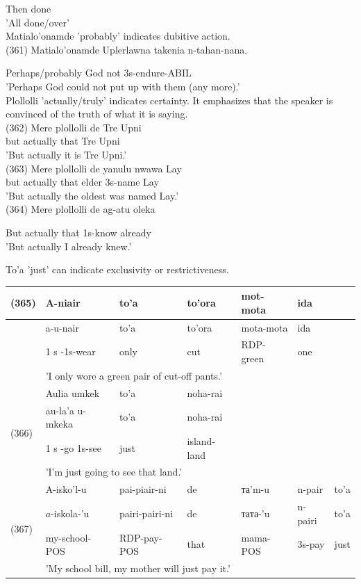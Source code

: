 \documentclass[10pt]{article}
\begin{document}
Then done\\
'All done/over'\\
Matialo'onamde 'probably' indicates dubitive action.\\
(361) Matialo'onamde Uplerlawna takenia n-tahan-nana.

Perhaps/probably God not 3s-endure-ABIL\\
'Perhaps God could not put up with them (any more).'\\
Plollolli 'actually/truly' indicates certainty. It emphasizes that the speaker is convinced of the truth of what it is saying.\\
(362) Mere plollolli de Tre Upni\\
but actually that Tre Upni\\
'But actually it is Tre Upni.'\\
(363) Mere plollolli de yanulu nwawa Lay\\
but actually that elder 3s-name Lay\\
'But actually the oldest was named Lay.'\\
(364) Mere plollolli de ag-atu oleka

But actually that 1s-know already\\
'But actually I already knew.'

To'a 'just' can indicate exclusivity or restrictiveness.

\begin{center}
\begin{tabular}{|l|l|l|l|l|l|l|}
\hline
\multirow[t]{4}{*}{(365)} & A-niair & to'a & to'ora & mot-mota & ida &  \\
\hline
 & a-u-nair & to'a & to'ora & mota-mota & ida &  \\
\hline
 & 1 s -1s-wear & only & cut & RDP-green & one &  \\
\hline
 & \multicolumn{6}{|l|}{'I only wore a green pair of cut-off pants.'} \\
\hline
\multirow[t]{4}{*}{(366)} & Aulia umkek & to'a & noha-rai &  &  &  \\
\hline
 & au-la'a u-mkeka & to'a & noha-rai &  &  &  \\
\hline
 & 1 s -go 1s-see & just & island-land &  &  &  \\
\hline
 & \multicolumn{6}{|l|}{'I'm just going to see that land.'} \\
\hline
\multirow[t]{4}{*}{(367)} & A-isko'l-u & pai-piair-ni & de & та'm-u & n-pair & to'a \\
\hline
 & \(a\)-iskola-'u & pairi-pairi-ni & de & тата-'u & n-pairi & to'a \\
\hline
 & my-school-POS & RDP-pay-POS & that & mama-POS & 3s-pay & just \\
\hline
 & \multicolumn{6}{|l|}{'My school bill, my mother will just pay it.'} \\
\hline
\end{tabular}
\end{center}
\end{document}
